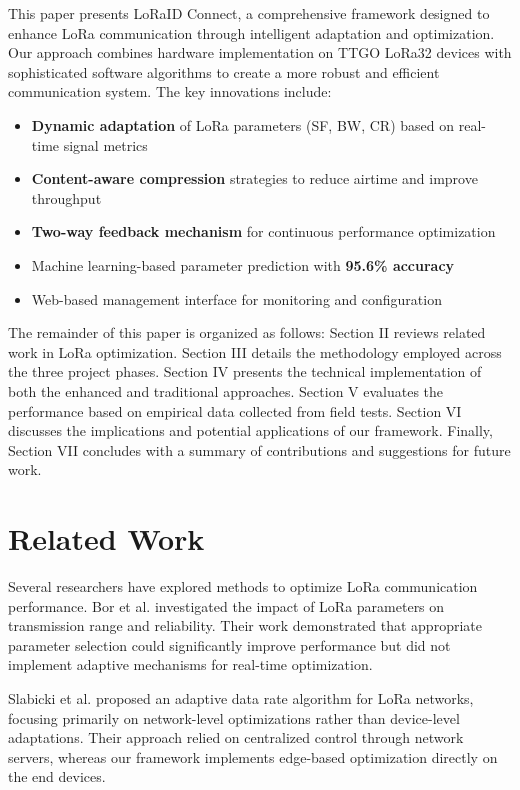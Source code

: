\documentclass[conference]{IEEEtran}
\begin{document}
This paper presents LoRaID Connect, a comprehensive framework designed to enhance LoRa communication through intelligent adaptation and optimization. Our approach combines hardware implementation on TTGO LoRa32 devices with sophisticated software algorithms to create a more robust and efficient communication system. The key innovations include:

\begin{itemize}
    \item \textbf{Dynamic adaptation} of LoRa parameters (SF, BW, CR) based on real-time signal metrics
    \item \textbf{Content-aware compression} strategies to reduce airtime and improve throughput
    \item \textbf{Two-way feedback mechanism} for continuous performance optimization
    \item Machine learning-based parameter prediction with \textbf{95.6\% accuracy}
    \item Web-based management interface for monitoring and configuration
\end{itemize}

The remainder of this paper is organized as follows: Section II reviews related work in LoRa optimization. Section III details the methodology employed across the three project phases. Section IV presents the technical implementation of both the enhanced and traditional approaches. Section V evaluates the performance based on empirical data collected from field tests. Section VI discusses the implications and potential applications of our framework. Finally, Section VII concludes with a summary of contributions and suggestions for future work.

\section{Related Work}
Several researchers have explored methods to optimize LoRa communication performance. Bor et al. \cite{bor2016lora} investigated the impact of LoRa parameters on transmission range and reliability. Their work demonstrated that appropriate parameter selection could significantly improve performance but did not implement adaptive mechanisms for real-time optimization.

Slabicki et al. \cite{slabicki2018adaptive} proposed an adaptive data rate algorithm for LoRa networks, focusing primarily on network-level optimizations rather than device-level adaptations. Their approach relied on centralized control through network servers, whereas our framework implements edge-based optimization directly on the end devices.
\end{document}
